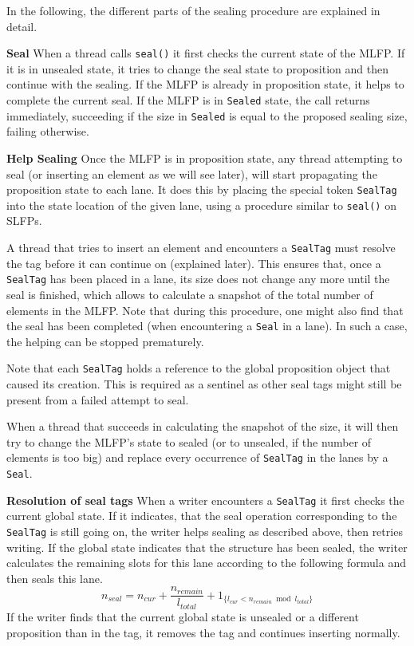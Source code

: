 \documentclass[runningheads,a4paper,fleqn]{llncs}
\begin{document}
In the following, the different parts of the sealing procedure are
explained in detail.

\textbf{Seal} When a thread calls \verb+seal()+ it first checks the
current state of the MLFP. If it is in unsealed state, it tries to
change the seal state to proposition and then continue with the
sealing. If the MLFP is already in proposition state, it helps
to complete the current seal. If the MLFP is in \verb+Sealed+ state, the
call returns immediately, succeeding if the size in \verb+Sealed+ is
equal to the proposed sealing size, failing otherwise.

\textbf{Help Sealing} Once the MLFP is in proposition state, any
thread attempting to seal (or inserting an element as we will see
later), will start propagating the proposition state to each lane. It
does this by placing the special token \verb+SealTag+ into the state
location of the given lane, using a procedure similar to \verb+seal()+
on SLFPs.

A thread that tries to insert an element and encounters a
\verb+SealTag+ must resolve the tag before it can continue on
(explained later). This ensures that, once a \verb+SealTag+ has been
placed in a lane, its size does not change any more until the seal is
finished, which allows to calculate a snapshot of the total number of
elements in the MLFP. Note that during this procedure, one might also
find that the seal has been completed (when encountering a \verb+Seal+
in a lane). In such a case, the helping can be stopped prematurely.

Note that each \verb+SealTag+ holds a reference to the global
proposition object that caused its creation. This is required as a
sentinel as other seal tags might still be present from a failed
attempt to seal.

When a thread that succeeds in calculating the snapshot of the size,
it will then try to change the MLFP's state to sealed (or to unsealed,
if the number of elements is too big) and replace every occurrence of
\verb+SealTag+ in the lanes by a \verb+Seal+.

\textbf{Resolution of seal tags} When a writer encounters a
\verb+SealTag+ it first checks the current global state. If it
indicates, that the seal operation corresponding to the \verb+SealTag+
is still going on, the writer helps sealing as described above, then
retries writing. If the global state indicates that the structure has
been sealed, the writer calculates the remaining slots for this lane
according to the following formula and then seals this lane.
\[ n_{seal} = n_{cur} + \frac{n_{remain}}{l_{total}} +
   1_{\{ l_{cur} < n_{remain} \bmod l_{total} \}} \]
If the writer finds that the current global state is unsealed or a
different proposition than in the tag, it removes the tag and
continues inserting normally.
\end{document}
